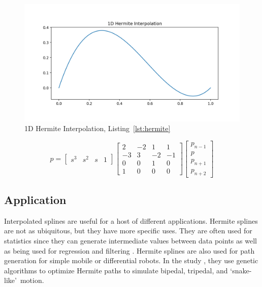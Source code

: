 \documentclass[12pt, letterpaper]{article}
\newcommand{\sorta}[1]{\lq #1\rq \,}
\begin{document}
\begin{figure}[h!]
  \centering
  \caption{1D Hermite Interpolation, Listing~\ref{lst:hermite}}
  \label{fig:HermiteGraph}
  \includegraphics[width=\linewidth]{hermite1}
  \vspace{-10pt}
\end{figure}

\begin{equation}
  \label{eq:HMatrix}
  p = 
  \begin{bmatrix}
    s^3 & s^2 & s & 1
  \end{bmatrix}
  \begin{bmatrix}
     2 & -2 &  1 &  1 \\
    -3 &  3 & -2 & -1 \\
     0 &  0 &  1 &  0 \\
     1 &  0 &  0 &  0
  \end{bmatrix}
  \begin{bmatrix}
    p_{n-1} \\
    p \\
    p_{n+1} \\
    p_{n+2}
  \end{bmatrix}
\end{equation}

\subsection{Application}
Interpolated splines are useful for a host of different applications. Hermite splines
are not as ubiquitous, but they have more specific uses. They are often used for statistics since they can
generate intermediate values between data points as well as being used for regression and filtering
\citep{HRegression}. Hermite splines are also used for path generation for simple mobile or differential
robots. In the study \cite{HMove}, they use genetic algorithms to optimize Hermite paths to simulate
bipedal, tripedal, and \sorta{snake-like} motion. 
\end{document}

